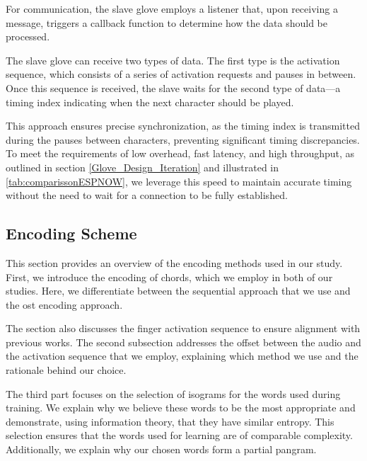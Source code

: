 For communication, the slave glove employs a listener that, upon receiving a message, triggers a callback function to determine how the data should be processed.

The slave glove can receive two types of data. The first type is the activation sequence, which consists of a series of activation requests and pauses in between. Once this sequence is received, the slave waits for the second type of data—a timing index indicating when the next character should be played.

This approach ensures precise synchronization, as the timing index is transmitted during the pauses between characters, preventing significant timing discrepancies. To meet the requirements of low overhead, fast latency, and high throughput, as outlined in section \ref{Glove_Design_Iteration} 
and illustrated in \autoref{tab:comparissonESPNOW}, we leverage this speed to maintain accurate timing without the need to wait for a connection to be fully established.



\subsection{Encoding Scheme}
This section provides an overview of the encoding methods used in our study. First, we introduce the encoding of chords, which we employ in both of our studies. Here, we differentiate between the sequential approach that we use and the \gls{ost} encoding approach.

The section also discusses the finger activation sequence to ensure alignment with previous works. The second subsection addresses the offset between the audio and the activation sequence that we employ, explaining which method we use and the rationale behind our choice.

The third part focuses on the selection of isograms for the words used during training. We explain why we believe these words to be the most appropriate and demonstrate, using information theory, that they have similar entropy. This selection ensures that the words used for learning are of comparable complexity. Additionally, we explain why our chosen words form a partial pangram.



